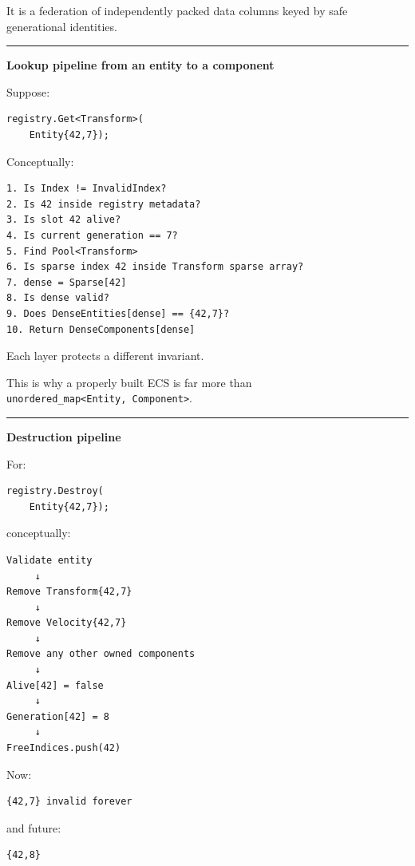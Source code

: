 It is a federation of independently packed data columns keyed by safe generational identities.

\begin{center}\rule{0.5\linewidth}{0.5pt}\end{center}

\textbf{Lookup pipeline from an entity to a component}

Suppose:

\begin{verbatim}
registry.Get<Transform>(
    Entity{42,7});
\end{verbatim}

Conceptually:

\begin{verbatim}
1. Is Index != InvalidIndex?
2. Is 42 inside registry metadata?
3. Is slot 42 alive?
4. Is current generation == 7?
5. Find Pool<Transform>
6. Is sparse index 42 inside Transform sparse array?
7. dense = Sparse[42]
8. Is dense valid?
9. Does DenseEntities[dense] == {42,7}?
10. Return DenseComponents[dense]
\end{verbatim}

Each layer protects a different invariant.

This is why a properly built ECS is far more than \texttt{unordered\_map\textless{}Entity,\ Component\textgreater{}}.

\begin{center}\rule{0.5\linewidth}{0.5pt}\end{center}

\textbf{Destruction pipeline}

For:

\begin{verbatim}
registry.Destroy(
    Entity{42,7});
\end{verbatim}

conceptually:

\begin{verbatim}
Validate entity
     ↓
Remove Transform{42,7}
     ↓
Remove Velocity{42,7}
     ↓
Remove any other owned components
     ↓
Alive[42] = false
     ↓
Generation[42] = 8
     ↓
FreeIndices.push(42)
\end{verbatim}

Now:

\begin{verbatim}
{42,7} invalid forever
\end{verbatim}

and future:

\begin{verbatim}
{42,8}
\end{verbatim}

